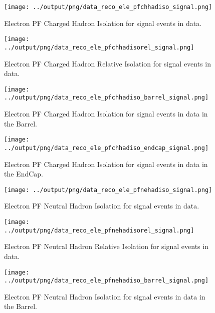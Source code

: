 \documentclass[11pt]{book}
\begin{document}
\begin{figure}[htb]
\centering
\texttt{[image: ../output/png/data\_reco\_ele\_pfchhadiso\_signal.png]}
\caption{Electron PF Charged Hadron Isolation for signal events in data.}
\label{fig:data_ele_pfchhadiso_signal}
\end{figure}

\begin{figure}[htb]
\centering
\texttt{[image: ../output/png/data\_reco\_ele\_pfchhadisorel\_signal.png]}
\caption{Electron PF Charged Hadron Relative Isolation for signal events in data.}
\label{fig:data_ele_pfchhadisorel_signal}
\end{figure}

\begin{figure}[htb]
\centering
\texttt{[image: ../output/png/data\_reco\_ele\_pfchhadiso\_barrel\_signal.png]}
\caption{Electron PF Charged Hadron Isolation for signal events in data in the Barrel.}
\label{fig:data_ele_pfchhadiso_barrel_signal}
\end{figure}

\begin{figure}[htb]
\centering
\texttt{[image: ../output/png/data\_reco\_ele\_pfchhadiso\_endcap\_signal.png]}
\caption{Electron PF Charged Hadron Isolation for signal events in data in the EndCap.}
\label{fig:data_ele_pfchhadiso_endcap_signal}
\end{figure}

\begin{figure}[htb]
\centering
\texttt{[image: ../output/png/data\_reco\_ele\_pfnehadiso\_signal.png]}
\caption{Electron PF Neutral Hadron Isolation for signal events in data.}
\label{fig:data_ele_pfnehadiso_signal}
\end{figure}

\begin{figure}[htb]
\centering
\texttt{[image: ../output/png/data\_reco\_ele\_pfnehadisorel\_signal.png]}
\caption{Electron PF Neutral Hadron Relative Isolation for signal events in data.}
\label{fig:data_ele_pfnehadisorel_signal}
\end{figure}

\begin{figure}[htb]
\centering
\texttt{[image: ../output/png/data\_reco\_ele\_pfnehadiso\_barrel\_signal.png]}
\caption{Electron PF Neutral Hadron Isolation for signal events in data in the Barrel.}
\label{fig:data_ele_pfnehadiso_barrel_signal}
\end{figure}
\end{document}
